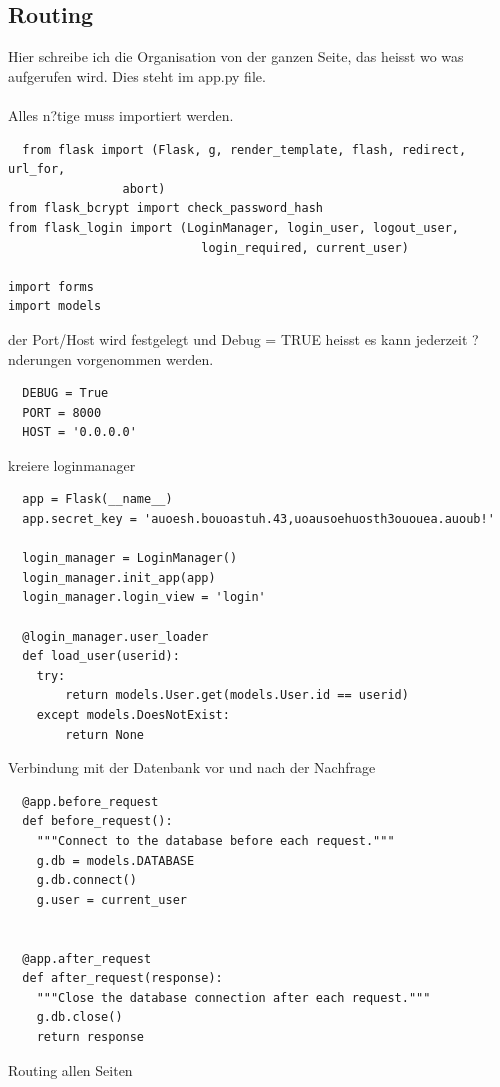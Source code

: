 \documentclass{article}
\begin{document}
\subsection{Routing}
Hier schreibe ich die Organisation von der ganzen Seite, das heisst wo was aufgerufen wird.
Dies steht im app.py file.\\
\\
Alles n?tige muss importiert werden.


\begin{lstlisting}
  from flask import (Flask, g, render_template, flash, redirect, url_for,
                abort)
from flask_bcrypt import check_password_hash
from flask_login import (LoginManager, login_user, logout_user,
                           login_required, current_user)

import forms
import models
\end{lstlisting}

der Port/Host wird festgelegt und Debug = TRUE heisst es kann jederzeit ?nderungen
vorgenommen werden.

\begin{lstlisting}
  DEBUG = True
  PORT = 8000
  HOST = '0.0.0.0'
\end{lstlisting}


kreiere loginmanager
\begin{lstlisting}
  app = Flask(__name__)
  app.secret_key = 'auoesh.bouoastuh.43,uoausoehuosth3ououea.auoub!'

  login_manager = LoginManager()
  login_manager.init_app(app)
  login_manager.login_view = 'login'

  @login_manager.user_loader
  def load_user(userid):
    try:
        return models.User.get(models.User.id == userid)
    except models.DoesNotExist:
        return None
\end{lstlisting}



Verbindung mit der Datenbank vor und nach der Nachfrage
\begin{lstlisting}
  @app.before_request
  def before_request():
    """Connect to the database before each request."""
    g.db = models.DATABASE
    g.db.connect()
    g.user = current_user


  @app.after_request
  def after_request(response):
    """Close the database connection after each request."""
    g.db.close()
    return response
\end{lstlisting}


Routing allen Seiten
\end{document}
